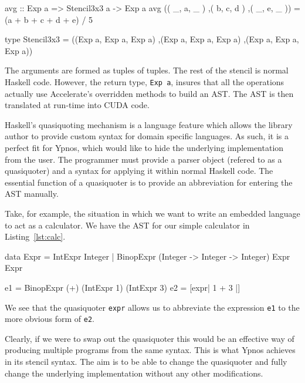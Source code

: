 \documentclass[12pt,a4paper,twoside]{scrbook}
\begin{document}
\begin{hflisting}[label={lst:ypsten}, caption=The ``average'' stencil defined
  using Accelerate's syntax.]
avg :: Exp a => Stencil3x3 a -> Exp a
avg (( _, a, _ )
    ,( b, c, d )
    ,( _, e, _ )) = (a + b + c + d + e) / 5

type Stencil3x3 = ((Exp a, Exp a, Exp a)
                  ,(Exp a, Exp a, Exp a)
                  ,(Exp a, Exp a, Exp a))
\end{hflisting}

The arguments are formed as tuples of tuples. The rest of the stencil is normal
Haskell code. However, the return type, \texttt{Exp a}, insures that all the
operations actually use Accelerate's overridden methods to build an AST. The AST
is then translated at run-time into CUDA code.

Haskell's quasiquoting mechanism is a language feature which allows the library
author to provide custom syntax for domain specific languages.  As such, it is a
perfect fit for Ypnos, which would like to hide the underlying implementation
from the user. The programmer must provide a parser object (refered to as a
quasiquoter) and a syntax for applying it within normal Haskell code. The
essential function of a quasiquoter is to provide an abbreviation for entering
the AST manually.

Take, for example, the situation in which we want to write an embedded
language to act as a calculator. We have the AST for our
simple calculator in Listing~\ref{lst:calc}.

\begin{hflisting}[label={lst:calc}, caption={A simple calculator defined using an
  AST (\texttt{Expr}) and using a quasiquoter for abbreviated syntax. The definition of
  \texttt{expr} is omitted.}]
data Expr  =  IntExpr Integer
           |  BinopExpr (Integer -> Integer -> Integer) Expr Expr

e1 = BinopExpr (+) (IntExpr 1) (IntExpr 3)
e2 = [expr| 1 + 3 |]
\end{hflisting}

We see that the quasiquoter \texttt{expr} allows us to abbreviate the expression
\texttt{e1} to the more obvious form of \texttt{e2}.

Clearly, if we were to swap out the quasiquoter this would be an
effective way of producing multiple programs from the same syntax. This
is what Ypnos achieves in its stencil syntax. The aim is to be able to
change the quasiquoter and fully change the underlying implementation
without any other modifications.
\end{document}
